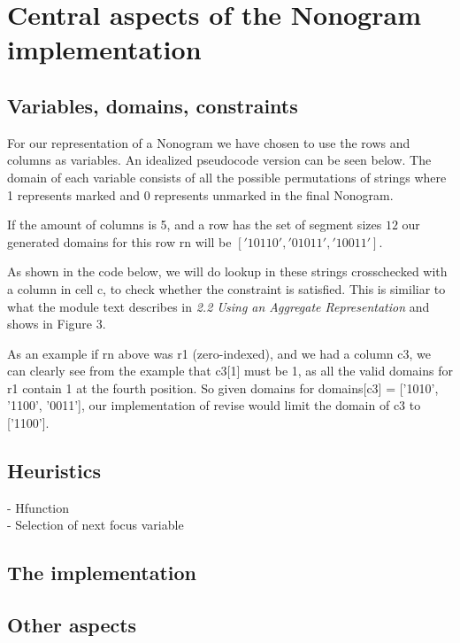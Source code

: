 
\section{Central aspects of the Nonogram implementation}
\subsection{Variables, domains, constraints}
For our representation of a Nonogram we have chosen to
use the rows and columns as variables. An idealized pseudocode
version can be seen below. The domain of each variable consists
of all the possible permutations of strings where 1 represents
marked and 0 represents unmarked in the final Nonogram.

If the amount of columns is 5, and a row has the set of segment
sizes \({1 2}\) our generated domains for this row rn will be
$ ['10110', '01011', '10011'] $.

As shown in the code below, we will do lookup in these strings
crosschecked with a column in cell c, to check whether the constraint
is satisfied. This is similiar to what the module text describes in
\emph{2.2 Using an Aggregate Representation} and shows in Figure 3.

As an example if rn above was r1 (zero-indexed), and we had a column
c3, we can clearly see from the example that c3[1] must be 1, as all the
valid domains for r1 contain 1 at the fourth position. So given domains
for domains[c3] = ['1010', '1100', '0011'], our implementation of revise
would limit the domain of c3 to ['1100'].



\subsection{Heuristics}
- H\-function\\
- Selection of next focus variable

\subsection*{The implementation}

\subsection{Other aspects}
